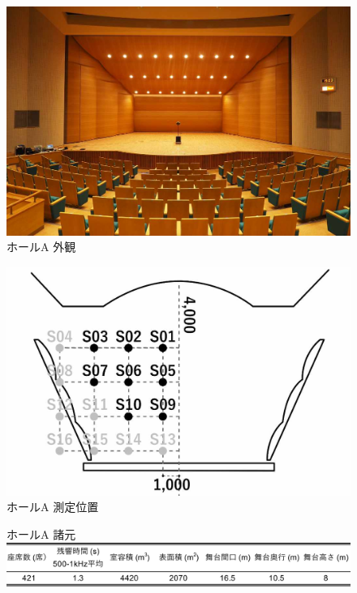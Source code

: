 \documentclass[11pt,a4j]{jreport}
\begin{document}

\newpage
\begin{figure}[H]
  \begin{minipage}{.5\linewidth} %
    \centering
    \includegraphics[width=.7\linewidth]{images/measuredHalls/resized/picture_a.jpg}
    \\ホールA 外観
  \end{minipage}%
  \begin{minipage}{.5\linewidth} %
    \centering
    \includegraphics[width=.7\linewidth]{images/measuredHalls/resized/flat_a.jpg}
    \\ホールA 測定位置
  \end{minipage}

  \begin{minipage}{1\linewidth}
    \centering
    ホールA 諸元\\
    \includegraphics[width=.8\linewidth]{images/measuredHalls/informationTable/a.pdf}
  \end{minipage}
\end{figure}
\end{document}
